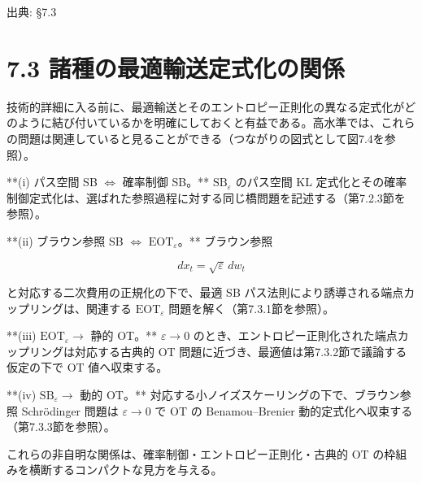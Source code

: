 

{\color{gray}\footnotesize 出典: §7.3\par}
\vspace{0.2em}

\section*{7.3 諸種の最適輸送定式化の関係}




技術的詳細に入る前に、最適輸送とそのエントロピー正則化の異なる定式化がどのように結び付いているかを明確にしておくと有益である。高水準では、これらの問題は関連していると見ることができる（つながりの図式として図7.4を参照）。

**(i) パス空間 SB $\Longleftrightarrow$ 確率制御 SB。** $\mathrm{SB}_\varepsilon$ のパス空間 KL 定式化とその確率制御定式化は、選ばれた参照過程に対する同じ橋問題を記述する（第7.2.3節を参照）。

**(ii) ブラウン参照 SB $\Longleftrightarrow$ $\mathrm{EOT}_\varepsilon$。** ブラウン参照

\[
dx_t=\sqrt{\varepsilon}\,dw_t
\]


と対応する二次費用の正規化の下で、最適 SB パス法則により誘導される端点カップリングは、関連する $\mathrm{EOT}_\varepsilon$ 問題を解く（第7.3.1節を参照）。

**(iii) $\mathrm{EOT}_\varepsilon\longrightarrow$ 静的 OT。** $\varepsilon\to 0$ のとき、エントロピー正則化された端点カップリングは対応する古典的 OT 問題に近づき、最適値は第7.3.2節で議論する仮定の下で OT 値へ収束する。

**(iv) $\mathrm{SB}_\varepsilon\longrightarrow$ 動的 OT。** 対応する小ノイズスケーリングの下で、ブラウン参照 Schrödinger 問題は $\varepsilon\to 0$ で OT の Benamou–Brenier 動的定式化へ収束する（第7.3.3節を参照）。

これらの非自明な関係は、確率制御・エントロピー正則化・古典的 OT の枠組みを横断するコンパクトな見方を与える。

